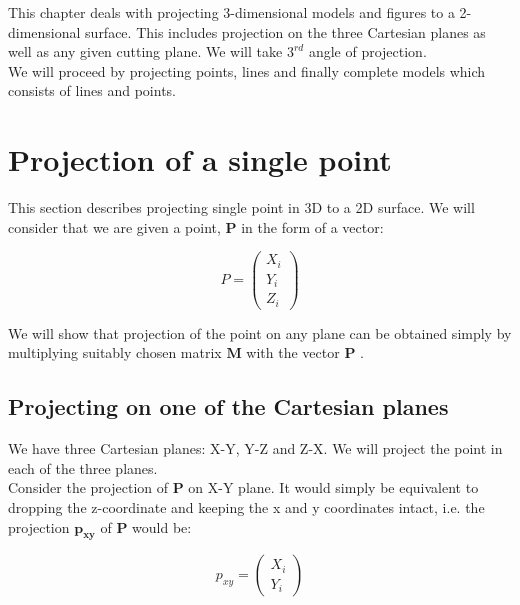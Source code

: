 \documentclass[a4paper,11pt,openany]{book}
\begin{document}
\indent This chapter deals with projecting 3-dimensional models and figures to a 2-dimensional surface. This includes projection on the three Cartesian planes as well as any given cutting plane. We will take $3^{rd}$ angle of projection.\\
\indent We will proceed by projecting points, lines and finally complete models which consists of lines and points.

\section{Projection of a single point}

This section describes projecting single point in 3D to a 2D surface. We will consider that we are given a point, $\boldsymbol{P}$ in the form of a vector:

    
\begin{equation}
P = 
\left(\begin{array}{c} X_i \\ Y_i \\ Z_i\end{array}\right) 
\end{equation}
    
We will show that projection of the point on any plane can be obtained simply by multiplying suitably chosen matrix $\boldsymbol{M}$ with the vector $\boldsymbol{P}$ . 
\subsection{Projecting on one of the Cartesian planes}
We have three Cartesian planes: X-Y, Y-Z and Z-X. We will project the point in each of the three planes. \\
\indent Consider the projection of $\boldsymbol{P}$ on X-Y plane. It would simply be equivalent to dropping the z-coordinate and keeping the x and y coordinates intact, i.e. the projection $\boldsymbol{p_{xy}}$ of $\boldsymbol{P}$ would be: 

\begin{equation}
p_{xy} = 
\left(\begin{array}{c} X_i \\ Y_i \end{array}\right) 
\end{equation} \\
\end{document}
